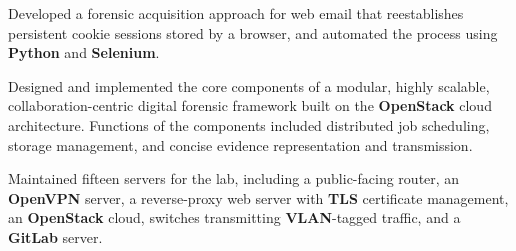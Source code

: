 \begin{rExperience}
        \item Developed a forensic acquisition approach for web email that reestablishes persistent cookie sessions
          stored by a browser, and automated the process using \textbf{Python} and \textbf{Selenium}.

        \item Designed and implemented the core components of a modular, highly scalable, collaboration-centric digital
          forensic framework built on the \textbf{OpenStack} cloud architecture. Functions of the components included
          distributed job scheduling, storage management, and concise evidence representation and
          transmission.


        \item Maintained fifteen servers for the lab, including a public-facing router, an \textbf{OpenVPN} server, a
          reverse-proxy web server with \textbf{TLS} certificate management, an \textbf{OpenStack} cloud, switches
          transmitting \textbf{VLAN}-tagged traffic, and a \textbf{GitLab} server.


\end{rExperience}
